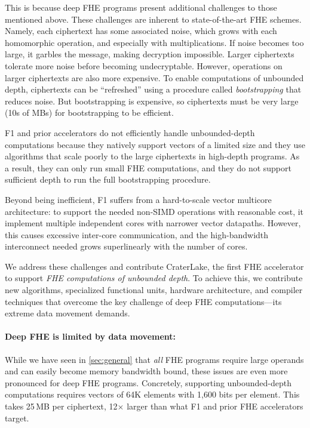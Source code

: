 This is because deep FHE programs present additional challenges to those
mentioned above. These challenges are inherent to state-of-the-art FHE schemes.
Namely, each ciphertext has some associated noise, which grows with each
homomorphic operation, and especially with multiplications. If noise becomes
too large, it garbles the message, making decryption impossible. Larger
ciphertexts tolerate more noise before becoming undecryptable. However,
operations on larger ciphertexts are also more expensive. To enable
computations of unbounded depth, ciphertexts can be ``refreshed'' using a
procedure called \emph{bootstrapping} that reduces noise. But bootstrapping is
expensive, so ciphertexts must be very large (10s of MBs) for bootstrapping to
be efficient.

F1 and prior accelerators do not efficiently handle unbounded-depth
computations because they natively support vectors of a limited size and they
use algorithms that scale poorly to the large ciphertexts in high-depth
programs. As a result, they can only run small FHE computations, and they do
not support sufficient depth to run the full bootstrapping procedure.


Beyond being inefficient, F1 suffers from a hard-to-scale vector multicore
architecture: to support the needed non-SIMD operations with reasonable cost,
it implement multiple independent cores with narrower vector datapaths.
However, this causes excessive inter-core communication, and the high-bandwidth
interconnect needed grows superlinearly with the number of cores.

We address these challenges and contribute CraterLake, the first FHE
accelerator to support \emph{FHE computations of unbounded depth}. To achieve
this, we contribute new algorithms, specialized functional units, hardware
architecture, and compiler techniques that overcome the key challenge of deep
FHE computations---its extreme data movement demands.

\paragraph{Deep FHE is limited by data movement:}
While we have seen in \autoref{sec:general} that \emph{all} FHE programs
require large operands and can easily become memory bandwidth bound, these
issues are even more pronounced for deep FHE programs. Concretely, supporting
unbounded-depth computations requires vectors of 64K elements with 1,600 bits
per element. This takes 25\,MB per ciphertext, 12$\times$ larger than what
F1 and prior FHE accelerators target.

